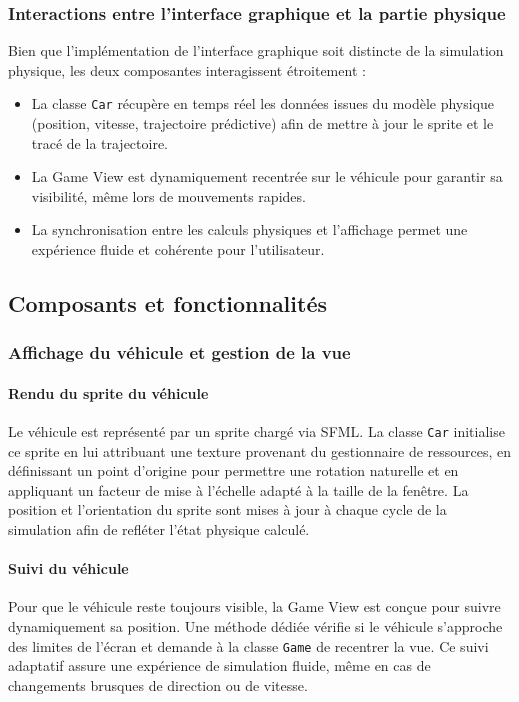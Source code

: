 \subsubsection{Interactions entre l'interface graphique et la partie physique}\label{subsubsec:interactions-entre-l-interface-graphique-et-la-partie-physique}
Bien que l'implémentation de l'interface graphique soit distincte de la simulation physique, les deux composantes interagissent étroitement :
\begin{itemize}
    \item La classe \texttt{Car} récupère en temps réel les données issues du modèle physique (position, vitesse, trajectoire prédictive) afin de mettre à jour le sprite et le tracé de la trajectoire.
    \item La Game View est dynamiquement recentrée sur le véhicule pour garantir sa visibilité, même lors de mouvements rapides.
    \item La synchronisation entre les calculs physiques et l'affichage permet une expérience fluide et cohérente pour l'utilisateur.
\end{itemize}

\subsection{Composants et fonctionnalités}\label{subsec:composants-et-fonctionnalites}

\subsubsection{Affichage du véhicule et gestion de la vue}\label{subsubsec:affichage-du-vehicule-et-gestion-de-la-vue}

\paragraph{Rendu du sprite du véhicule}
Le véhicule est représenté par un sprite chargé via SFML. La classe \texttt{Car} initialise ce sprite en lui attribuant une texture provenant du gestionnaire de ressources, en définissant un point d'origine pour permettre une rotation naturelle et en appliquant un facteur de mise à l'échelle adapté à la taille de la fenêtre.
La position et l'orientation du sprite sont mises à jour à chaque cycle de la simulation afin de refléter l'état physique calculé.

\paragraph{Suivi du véhicule}
Pour que le véhicule reste toujours visible, la Game View est conçue pour suivre dynamiquement sa position.
Une méthode dédiée vérifie si le véhicule s'approche des limites de l'écran et demande à la classe \texttt{Game} de recentrer la vue.
Ce suivi adaptatif assure une expérience de simulation fluide, même en cas de changements brusques de direction ou de vitesse.

